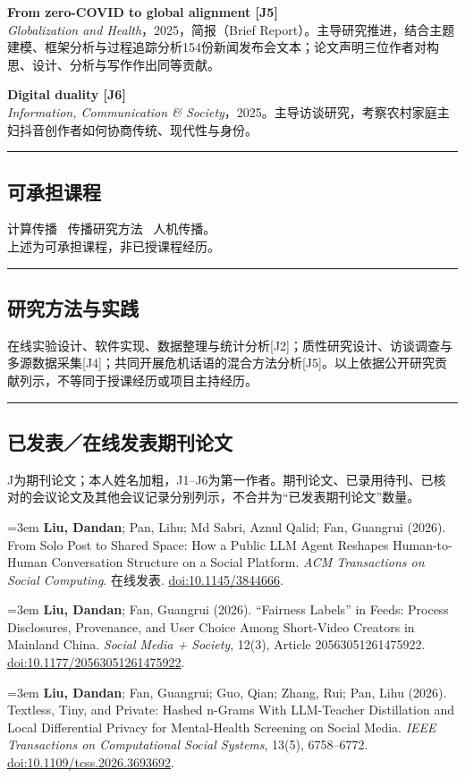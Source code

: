 \documentclass[a4paper,11pt]{article}
\newcommand{\sep}{{\,\textperiodcentered\,\,}}
\newcommand{\hsep}{\noindent\textcolor{teal}{\rule{\textwidth}{0.5pt}}}
\newcommand{\block}[1]{\par\addvspace{7pt}\Needspace{5\baselineskip}\hsep\vspace{-8pt}\subsection*{#1}}
\newcommand{\publication}[2]{%
  \par\addvspace{8pt}\noindent
  \begin{minipage}{\linewidth}
    \linespread{1.06}\fontsize{10.8}{13.4}\selectfont\raggedright
    \hangindent=3em\hangafter=1
    \makebox[3em][l]{\textcolor{teal}{[#1]}}#2
  \end{minipage}\par}
\begin{document}
\textbf{From zero-COVID to global alignment [J5]}\\
{\small \emph{Globalization and Health}，2025，简报（Brief Report）。主导研究推进，结合主题建模、框架分析与过程追踪分析154份新闻发布会文本；论文声明三位作者对构思、设计、分析与写作作出同等贡献。}

\textbf{Digital duality [J6]}\\
{\small \emph{Information, Communication \& Society}，2025。主导访谈研究，考察农村家庭主妇抖音创作者如何协商传统、现代性与身份。}

\clearpage
\block{可承担课程}
{\small 计算传播 \sep 传播研究方法 \sep 人机传播。\\
上述为可承担课程，非已授课程经历。}

\block{研究方法与实践}
{\small 在线实验设计、软件实现、数据整理与统计分析[J2]；质性研究设计、访谈调查与多源数据采集[J4]；共同开展危机话语的混合方法分析[J5]。以上依据公开研究贡献列示，不等同于授课经历或项目主持经历。}

\block{已发表／在线发表期刊论文}
{\small J为期刊论文；本人姓名加粗，J1--J6为第一作者。期刊论文、已录用待刊、已核对的会议论文及其他会议记录分别列示，不合并为“已发表期刊论文”数量。}\par
\publication{J1}{\textbf{Liu, Dandan}; Pan, Lihu; Md Sabri, Aznul Qalid; Fan, Guangrui (2026). From Solo Post to Shared Space: How a Public LLM Agent Reshapes Human-to-Human Conversation Structure on a Social Platform. \emph{ACM Transactions on Social Computing}. 在线发表. \href{https://doi.org/10.1145/3844666}{doi:10.1145/3844666}.}

\publication{J2}{\textbf{Liu, Dandan}; Fan, Guangrui (2026). “Fairness Labels” in Feeds: Process Disclosures, Provenance, and User Choice Among Short-Video Creators in Mainland China. \emph{Social Media + Society}, 12(3), Article 20563051261475922. \href{https://doi.org/10.1177/20563051261475922}{doi:10.1177/20563051261475922}.}

\publication{J3}{\textbf{Liu, Dandan}; Fan, Guangrui; Guo, Qian; Zhang, Rui; Pan, Lihu (2026). Textless, Tiny, and Private: Hashed n-Grams With LLM-Teacher Distillation and Local Differential Privacy for Mental-Health Screening on Social Media. \emph{IEEE Transactions on Computational Social Systems}, 13(5), 6758--6772. \href{https://doi.org/10.1109/tcss.2026.3693692}{doi:10.1109/tcss.2026.3693692}.}
\end{document}
